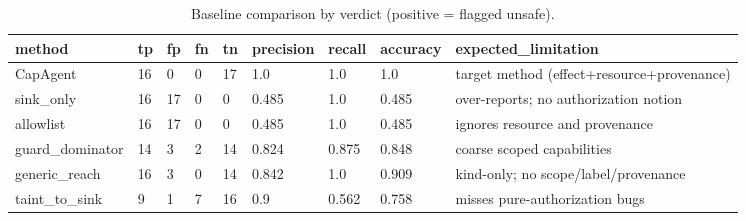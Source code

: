 \begin{table}[t]
\centering
\begin{tabular}{lllllllll}
\toprule
method & tp & fp & fn & tn & precision & recall & accuracy & expected\_limitation \\
\midrule
CapAgent & 16 & 0 & 0 & 17 & 1.0 & 1.0 & 1.0 & target method (effect+resource+provenance) \\
sink\_only & 16 & 17 & 0 & 0 & 0.485 & 1.0 & 0.485 & over-reports; no authorization notion \\
allowlist & 16 & 17 & 0 & 0 & 0.485 & 1.0 & 0.485 & ignores resource and provenance \\
guard\_dominator & 14 & 3 & 2 & 14 & 0.824 & 0.875 & 0.848 & coarse scoped capabilities \\
generic\_reach & 16 & 3 & 0 & 14 & 0.842 & 1.0 & 0.909 & kind-only; no scope/label/provenance \\
taint\_to\_sink & 9 & 1 & 7 & 16 & 0.9 & 0.562 & 0.758 & misses pure-authorization bugs \\
\bottomrule
\end{tabular}
\caption{Baseline comparison by verdict (positive = flagged unsafe).}
\label{tab:baselines}
\end{table}